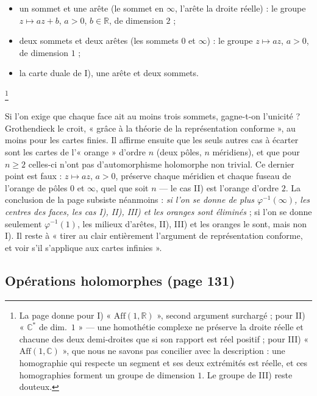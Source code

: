 \documentclass[11pt,a4paper]{article}
\begin{document}
\begin{itemize}
\item[I)] un sommet et une arête (le sommet en $\infty$, l'arête la droite
réelle) : le groupe $z \mapsto az + b$, $a > 0$, $b \in \mathbb{R}$, de dimension
$2$ ;
\item[II)] deux sommets et deux arêtes (les sommets $0$ et $\infty$) : le groupe
$z \mapsto az$, $a > 0$, de dimension $1$ ;
\item[III)] la carte duale de I), une arête et deux sommets.
\end{itemize}

\footnote{La page donne pour I) « $\mathrm{Aff}(1, \mathbb{R})$ », second argument
surchargé ; pour II) « $\mathbb{C}^{*}$ de dim.\ $1$ » --- une homothétie
complexe ne préserve la droite réelle et chacune des deux demi-droites que si
son rapport est réel positif ; pour III) « $\mathrm{Aff}(1, \mathbb{C})$ », que
nous ne savons pas concilier avec la description : une homographie qui
respecte un segment et ses deux extrémités est réelle, et ces homographies
forment un groupe de dimension $1$. Le groupe de III) reste douteux.}

Si l'on exige que chaque face ait au moins trois sommets, gagne-t-on
l'unicité ? Grothendieck le croit, « grâce à la théorie de la représentation
conforme », au moins pour les cartes finies. Il affirme ensuite que les seuls
autres cas à écarter sont les cartes de l'« orange » d'ordre $n$ (deux pôles,
$n$ méridiens), et que pour $n \geqslant 2$ celles-ci n'ont pas d'automorphisme
holomorphe non trivial. Ce dernier point est faux : $z \mapsto az$, $a > 0$,
préserve chaque méridien et chaque fuseau de l'orange de pôles $0$ et $\infty$,
quel que soit $n$ --- le cas II) est l'orange d'ordre $2$. La conclusion de la
page subsiste néanmoins : \emph{si l'on se donne de plus $\varphi^{-1}(\infty)$,
les centres des faces, les cas I), II), III) et les oranges sont éliminés} ; si
l'on se donne seulement $\varphi^{-1}(1)$, les milieux d'arêtes, II), III) et les
oranges le sont, mais non I). Il reste à « tirer au clair entièrement
l'argument de représentation conforme, et voir s'il s'applique aux cartes
infinies ».

\subsection*{Opérations holomorphes (page 131)}
\end{document}
